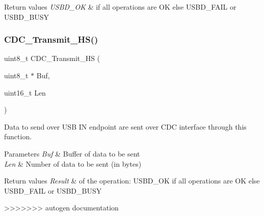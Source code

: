 \begin{DoxyRetVals}{Return values}
{\em U\+S\+B\+D\+\_\+\+OK} & if all operations are OK else U\+S\+B\+D\+\_\+\+F\+A\+IL or U\+S\+B\+D\+\_\+\+B\+U\+SY \\
\hline
\end{DoxyRetVals}
\mbox{\label{group___u_s_b_d___c_d_c___i_f___exported___functions_prototype_ga2e774589b6717992afd2b46280dabb8c}} 
\subsubsection{\texorpdfstring{C\+D\+C\+\_\+\+Transmit\+\_\+\+H\+S()}{CDC\_Transmit\_HS()}}
{\footnotesize\ttfamily uint8\+\_\+t C\+D\+C\+\_\+\+Transmit\+\_\+\+HS (\begin{DoxyParamCaption}\item[{uint8\+\_\+t $\ast$}]{Buf,  }\item[{uint16\+\_\+t}]{Len }\end{DoxyParamCaption})}



Data to send over U\+SB IN endpoint are sent over C\+DC interface through this function. 


\begin{DoxyParams}{Parameters}
{\em Buf} & Buffer of data to be sent \\
\hline
{\em Len} & Number of data to be sent (in bytes) \\
\hline
\end{DoxyParams}

\begin{DoxyRetVals}{Return values}
{\em Result} & of the operation\+: U\+S\+B\+D\+\_\+\+OK if all operations are OK else U\+S\+B\+D\+\_\+\+F\+A\+IL or U\+S\+B\+D\+\_\+\+B\+U\+SY \\
\hline
\end{DoxyRetVals}
>>>>>>> autogen documentation
